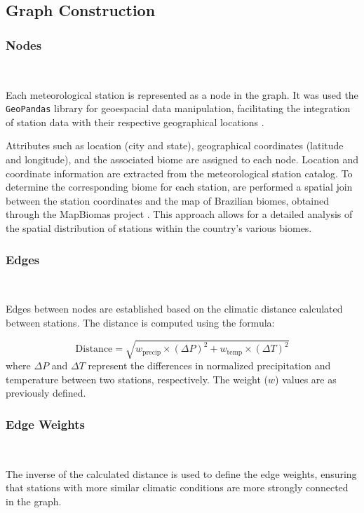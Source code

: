 \documentclass[conference]{IEEEtran}
\begin{document}
\subsection{Graph Construction}

\subsubsection{Nodes}

\


Each meteorological station is represented as a node in the graph. It was used the \texttt{GeoPandas} library for geoespacial data manipulation, facilitating the integration of station data with their respective geographical locations \cite{geopandas2023}.

Attributes such as location (city and state), geographical coordinates (latitude and longitude), and the associated biome are assigned to each node. Location and coordinate information are extracted from the meteorological station catalog. To determine the corresponding biome for each station, are performed a spatial join between the station coordinates and the map of Brazilian biomes, obtained through the MapBiomas project \cite{mapbiomas2025}. This approach allows for a detailed analysis of the spatial distribution of stations within the country's various biomes.
\subsubsection{Edges}

\

Edges between nodes are established based on the climatic distance calculated between stations. The distance is computed using the formula:

\begin{equation}
  \text{Distance} = \sqrt{w_{\text{precip}} \times (\Delta P)^2 + w_{\text{temp}} \times (\Delta T)^2}
  \label{eq1:whittaker}
\end{equation}
where \( \Delta P \) and \( \Delta T \) represent the differences in normalized precipitation and temperature between two stations, respectively. The weight (\( w \)) values are as previously defined.
\subsubsection{Edge Weights}

\

The inverse of the calculated distance is used to define the edge weights, ensuring that stations with more similar climatic conditions are more strongly connected in the graph.
\end{document}
